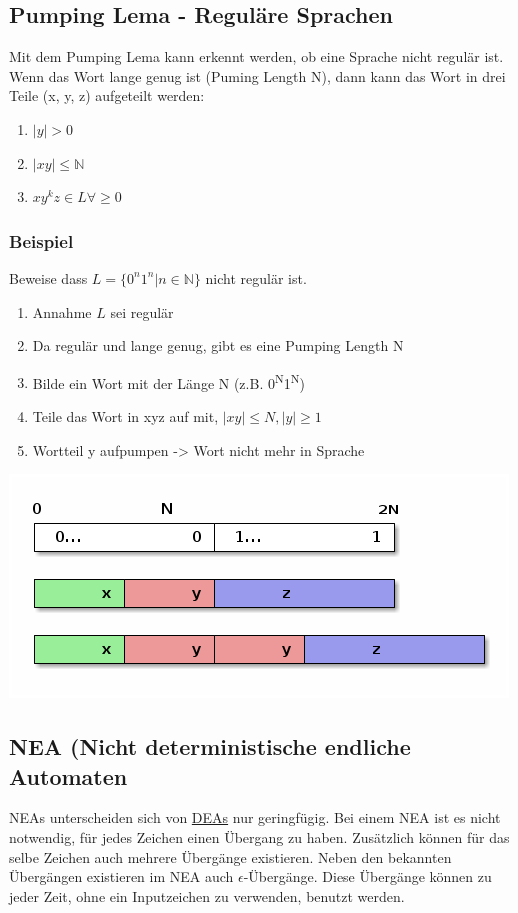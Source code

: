 \documentclass[11pt,twoside,landscape]{article}
\begin{document}
\begin{multicols}{3}
\subsection*{Pumping Lema - Reguläre Sprachen}
\label{sec:org3765357}
Mit dem Pumping Lema kann erkennt werden, ob eine Sprache nicht regulär ist. Wenn das Wort lange genug ist (Puming Length N), dann kann das Wort in drei Teile (x, y, z) aufgeteilt werden:
\begin{enumerate}
\item \(|y| > 0\)
\item \(|xy| \leq \mathbb{N}\)
\item \(xy^kz \in L  \forall \geq 0\)
\end{enumerate}

\subsubsection*{Beispiel}
\label{sec:orgbc7ba8b}
Beweise dass \(L = \{0^n1^n | n \in \mathbb{N}\}\) nicht regulär ist.

\begin{enumerate}
\item Annahme \(L\) sei regulär
\item Da regulär und lange genug, gibt es eine Pumping Length N
\item Bilde ein Wort mit der Länge N (z.B. 0\textsuperscript{N}1\textsuperscript{N})
\item Teile das Wort in xyz auf mit, \(|xy| \leq N, |y| \geq 1\)
\item Wortteil y aufpumpen -> Wort nicht mehr in Sprache
\end{enumerate}

\begin{center}
\includegraphics[width=.9\linewidth]{static/img/autospr/pumping_lema.png}
\end{center}

\subsection*{NEA (Nicht deterministische endliche Automaten}
\label{sec:org6ccd1e1}
NEAs unterscheiden sich von \hyperref[sec:org9a3d5c7]{DEAs} nur geringfügig. Bei einem NEA ist es nicht notwendig, für jedes Zeichen einen Übergang zu haben. Zusätzlich können für das selbe Zeichen auch mehrere Übergänge existieren. Neben den bekannten Übergängen existieren im NEA auch \(\epsilon\)-Übergänge. Diese Übergänge können zu jeder Zeit, ohne ein Inputzeichen zu verwenden, benutzt werden.


\end{multicols}
\end{document}
